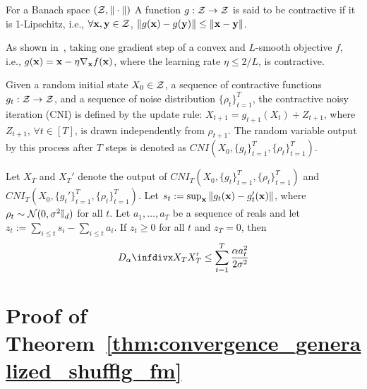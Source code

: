 \begin{definition}
\label{def:contraction}
    For a Banach space $({\mathcal{Z}}, \|\cdot \|)$ A function $g: {\mathcal{Z}} \rightarrow {\mathcal{Z}}$ is said to be contractive if it is 1-Lipschitz, i.e., $\forall {\mathbf{x}}, {\mathbf{y}} \in {\mathcal{Z}}$, $\|g({\mathbf{x}}) - g({\mathbf{y}})\| \leq \| {\mathbf{x}} - {\mathbf{y}} \|$.
\end{definition}

\begin{remark}
\label{remark:contractive_operators}
    As shown in~\cite{Feldman2018privacy_amp_iter}, taking one gradient step of a convex and $L$-smooth objective $f$, i.e., $g({\mathbf{x}}) = {\mathbf{x}} - \eta \nabla_{{\mathbf{x}}} f({\mathbf{x}})$, where the learning rate $\eta \leq 2/L$, is contractive. 
\end{remark}

\begin{definition}
\label{def:cni}
    Given a random initial state $X_0 \in {\mathcal{Z}}$, a sequence of contractive functions $g_t: {\mathcal{Z}} \rightarrow {\mathcal{Z}}$, and a sequence of noise distribution $\{\rho_t\}_{t=1}^{T}$, the contractive noisy iteration (CNI) is defined by the update rule: $X_{t+1} = g_{t+1}(X_t) + Z_{t+1}$,
    where $Z_{t+1}$, $\forall t\in [T]$, is drawn independently from $\rho_{t+1}$. The random variable output by this process after $T$ steps is denoted as $CNI(X_0, \{g_t\}_{t=1}^{T}, \{\rho_t\}_{t=1}^{T})$.  
\end{definition}

\begin{theorem}
\label{thm:pabi}
    Let $X_T$ and $X_{T}'$ denote the output of $CNI_T(X_0, \{g_t\}_{t=1}^{T}, \{\rho_t\}_{t=1}^{T})$ and $CNI_T(X_0, \{g_t'\}_{t=1}^{T}, \{\rho_t\}_{t=1}^{T})$.
    Let $s_t := \sup_{{\mathbf{x}}} \|g_t({\mathbf{x}}) - g_t'({\mathbf{x}})\|$, where $\rho_t \sim {\mathcal{N}}(0, \sigma^2 {\mathbb{I}}_d)$ for all $t$. Let $a_1, \dots, a_T$ be a sequence of reals and let $z_t := \sum_{i \leq t} s_i - \sum_{i\leq t}a_i$. If $z_t \geq 0$ for all $t$ and $z_T = 0$, then
    \begin{align*}
        \infdivalpha{X_T}{X_T'} \leq \sum_{t=1}^{T} \frac{\alpha a_t^2}{2 \sigma^2}
    \end{align*}
\end{theorem}


\section{Proof of Theorem~\ref{thm:convergence_generalized_shufflg_fm}}
\label{sec:appendix_proof_main_thm}




